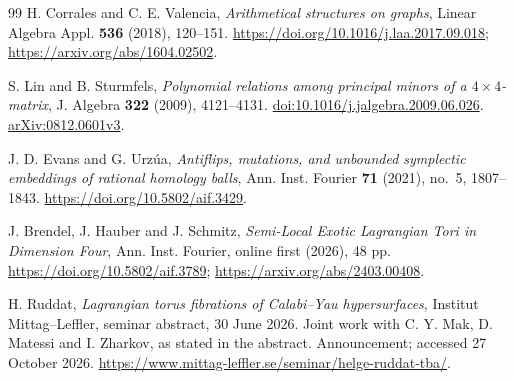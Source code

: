 \begin{thebibliography}{99}
H. Corrales and C. E. Valencia,
\emph{Arithmetical structures on graphs},
Linear Algebra Appl. \textbf{536} (2018), 120--151.
\url{https://doi.org/10.1016/j.laa.2017.09.018};
\url{https://arxiv.org/abs/1604.02502}.



S. Lin and B. Sturmfels,
\emph{Polynomial relations among principal minors of a $4\times4$-matrix},
J. Algebra \textbf{322} (2009), 4121--4131.
\href{https://doi.org/10.1016/j.jalgebra.2009.06.026}{doi:10.1016/j.jalgebra.2009.06.026}.
\href{https://arxiv.org/abs/0812.0601}{arXiv:0812.0601v3}.


J. D. Evans and G. Urz\'ua,
\emph{Antiflips, mutations, and unbounded symplectic embeddings of rational homology balls},
Ann. Inst. Fourier \textbf{71} (2021), no.~5, 1807--1843.
\url{https://doi.org/10.5802/aif.3429}.

J. Brendel, J. Hauber and J. Schmitz,
\emph{Semi-Local Exotic Lagrangian Tori in Dimension Four},
Ann. Inst. Fourier, online first (2026), 48 pp.
\url{https://doi.org/10.5802/aif.3789};
\url{https://arxiv.org/abs/2403.00408}.

H. Ruddat,
\emph{Lagrangian torus fibrations of Calabi--Yau hypersurfaces},
Institut Mittag--Leffler, seminar abstract, 30 June 2026.
Joint work with C. Y. Mak, D. Matessi and I. Zharkov, as stated in the abstract.
Announcement; accessed 27 October 2026.
\url{https://www.mittag-leffler.se/seminar/helge-ruddat-tba/}.

\end{thebibliography}
